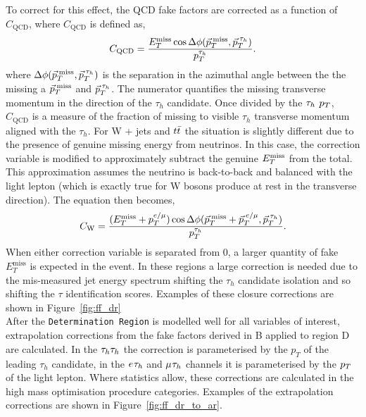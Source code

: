 To correct for this effect, the QCD fake factors are corrected as a function of $C_{\text{QCD}}$, where $C_{\text{QCD}}$ is defined as,
\begin{equation}
C_{\text{QCD}} = \frac{E_{T}^{\text{miss}} \cos\Delta\phi(\vec{p}_{T}^{\text{\hspace{2pt}miss}},\vec{p}_{T}^{\hspace{2pt}\tau_{h}})}{p_{T}^{\tau_{h}}}.
\label{eqn:c_qcd}
\end{equation}
where $\Delta\phi(\vec{p}_{T}^{\hspace{2pt}\text{miss}},\vec{p}_{T}^{\hspace{2pt}\tau_{h}})$ is the separation in the azimuthal angle between the the missing a $\vec{p}_{T}^{\hspace{2pt}\text{miss}}$ and $\vec{p}_{T}^{\hspace{2pt}\tau_{h}}$.
The numerator quantifies the missing transverse momentum in the direction of the $\tau_h$ candidate. 
Once divided by the $\tau_{h}$ $p_{T}$, $C_{\text{QCD}}$ is a measure of the fraction of missing to visible $\tau_h$ transverse momentum aligned with the $\tau_h$.
For W + jets and $t\bar{t}$ the situation is slightly different due to the presence of genuine missing energy from neutrinos.
In this case, the correction variable is modified to approximately subtract the genuine $E_{T}^{\text{miss}}$ from the total.
This approximation assumes the neutrino is back-to-back and balanced with the light lepton (which is exactly true for W bosons produce at rest in the transverse direction). 
The equation then becomes,
\begin{equation}
C_{\text{W}} = \frac{(E_{T}^{\text{miss}}+p_{T}^{e/\mu}) \cos\Delta\phi(\vec{p}_{T}^{\text{\hspace{2pt}miss}}+\vec{p}_{T}^{\hspace{2pt}e/\mu},\vec{p}_{T}^{\hspace{2pt}\tau_{h}})}{p_{T}^{\tau_{h}}}.
\label{eqn:c_w}
\end{equation}
When either correction variable is separated from 0, a larger quantity of fake $E_{T}^{\text{miss}}$ is expected in the event. 
In these regions a large correction is needed due to the mis-measured jet energy spectrum shifting the $\tau_h$ candidate isolation and so shifting the $\tau$ identification scores. 
Examples of these closure corrections are shown in Figure~\ref{fig:ff_dr}\\

After the \texttt{Determination Region} is modelled well for all variables of interest, extrapolation corrections from the fake factors derived in B applied to region D are calculated.
In the $\tau_{h}\tau_{h}$ the correction is parameterised by the $p_{T}$ of the leading $\tau_h$ candidate, in the $e_{}\tau_{h}$ and $\mu_{}\tau_{h}$ channels it is parameterised by the $p_{T}$ of the light lepton.
Where statistics allow, these corrections are calculated in the high mass optimisation procedure categories.
Examples of the extrapolation corrections are shown in Figure~\ref{fig:ff_dr_to_ar}.

